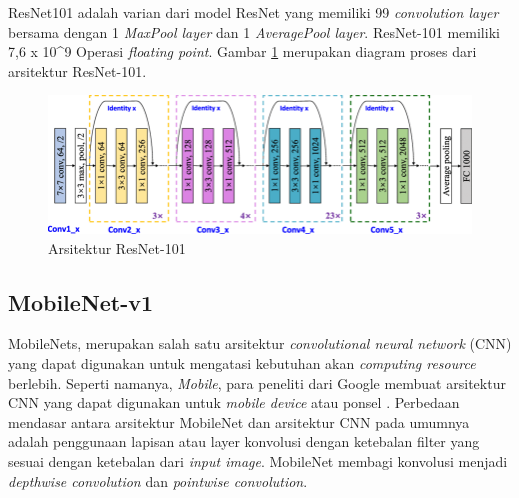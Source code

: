 ResNet101 adalah varian dari model ResNet yang memiliki 99 \textit{convolution layer} bersama dengan 1 \textit{MaxPool layer} dan 1 \textit{AveragePool layer}. ResNet-101 memiliki 7,6 x 10\^{}9 Operasi \textit{floating point}. Gambar \ref{fig:resnet101-arch} merupakan diagram proses dari arsitektur ResNet-101.
\begin{figure}[H]
	\centering
	\includegraphics[scale=0.25]{gambar/resnet101-arch.png}
	\caption{Arsitektur ResNet-101 \citep{resnet101-arch}}
	\label{fig:resnet101-arch}
\end{figure}

\subsection{MobileNet-v1}
\label{subsec:mobilenetv1-definition}

MobileNets, merupakan salah satu arsitektur \textit{convolutional neural network} (CNN) yang dapat digunakan untuk mengatasi kebutuhan akan \textit{computing resource} berlebih. Seperti namanya, \textit{Mobile}, para peneliti dari Google membuat arsitektur CNN yang dapat digunakan untuk \textit{mobile device} atau ponsel \citep{mobilnet-def}. Perbedaan mendasar antara arsitektur MobileNet dan arsitektur CNN pada umumnya adalah penggunaan lapisan atau layer konvolusi dengan ketebalan filter yang sesuai dengan ketebalan dari \textit{input image}. MobileNet membagi konvolusi menjadi \textit{depthwise convolution} dan \textit{pointwise convolution}.

